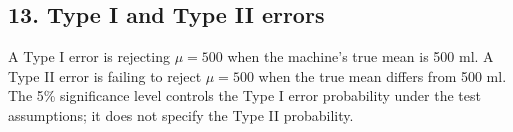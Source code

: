 \documentclass[11pt,a4paper]{article}
\begin{document}
\noindent\begin{minipage}{\linewidth}\subsection*{13. Type I and Type II errors}

A Type I error is rejecting $\mu=500$ when the machine's true mean is 500 ml. A Type II error is failing to reject $\mu=500$ when the true mean differs from 500 ml. The 5\% significance level controls the Type I error probability under the test assumptions; it does not specify the Type II probability.
\end{minipage}\par\medskip
\end{document}
